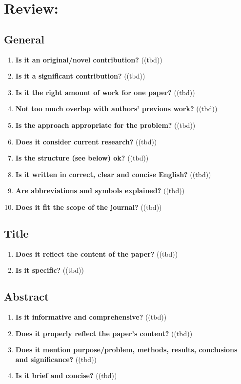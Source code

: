 
\chapter*{Review: \metaTitle}\minitoc\label{sec:review}\vspace{.5cm}
\setcounter{chapter}{1}
\noindent\lipsum[7]

\section{General}\label{sec:general}
\begin{enumerate}[resume]
    \item \textbf{Is it an original/novel contribution?} ((tbd))
    \item \textbf{Is it a significant contribution?} ((tbd))
    \item \textbf{Is it the right amount of work for one paper?} ((tbd))
    \item \textbf{Not too much overlap with authors’ previous work?} ((tbd))
    \item \textbf{Is the approach appropriate for the problem?} ((tbd))
    \item \textbf{Does it consider current research?} ((tbd))
    \item \textbf{Is the structure (see below) ok?} ((tbd))
    \item \textbf{Is it written in correct, clear and concise English?} ((tbd))
    \item \textbf{Are abbreviations and symbols explained?} ((tbd))
    \item \textbf{Does it fit the scope of the journal?} ((tbd))
\end{enumerate}

\section{Title}\label{sec:title}
\begin{enumerate}[resume]
    \item \textbf{Does it reflect the content of the paper?} ((tbd))
    \item \textbf{Is it specific?} ((tbd))
\end{enumerate}

\section{Abstract}\label{sec:abstract}
\begin{enumerate}[resume]
    \item \textbf{Is it informative and comprehensive?} ((tbd))
    \item \textbf{Does it properly reflect the paper’s content?} ((tbd))
    \item \textbf{Does it mention purpose/problem, methods, results, conclusions and significance?} ((tbd))
    \item \textbf{Is it brief and concise?} ((tbd))
\end{enumerate}

